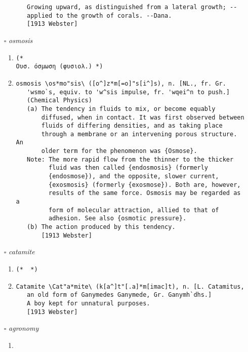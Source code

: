 \documentclass{article}
\begin{document}
\begin{itemize}
\begin{enumerate}
{\begin{lstlisting}
   Growing upward, as distinguished from a lateral growth; --
   applied to the growth of corals. --Dana.
   [1913 Webster]
\end{lstlisting}}
\end{enumerate}
\item[$\square$] \emph{ osmosis }
\begin{enumerate}
\item{
\begin{lstlisting}
(* 
Ουσ. όσμωση (φυσιολ.) *)
\end{lstlisting}}
\item{
\begin{lstlisting}
osmosis \os*mo"sis\ ([o^]z*m[=o]"s[i^]s), n. [NL., fr. Gr.
   'wsmo`s, equiv. to 'w^sis impulse, fr. 'wqei^n to push.]
   (Chemical Physics)
   (a) The tendency in fluids to mix, or become equably
       diffused, when in contact. It was first observed between
       fluids of differing densities, and as taking place
       through a membrane or an intervening porous structure. An
       older term for the phenomenon was {Osmose}.
   Note: The more rapid flow from the thinner to the thicker
         fluid was then called {endosmosis} (formerly
         {endosmose}), and the opposite, slower current,
         {exosmosis} (formerly {exosmose}). Both are, however,
         results of the same force. Osmosis may be regarded as a
         form of molecular attraction, allied to that of
         adhesion. See also {osmotic pressure}.
   (b) The action produced by this tendency.
       [1913 Webster]
\end{lstlisting}}
\end{enumerate}
\item[$\square$] \emph{ catamite }
\begin{enumerate}
\item{
\begin{lstlisting}
(*  *)
\end{lstlisting}}
\item{
\begin{lstlisting}
Catamite \Cat"a*mite\ (k[a^]t"[.a]*m[imac]t), n. [L. Catamitus,
   an old form of Ganymedes Ganymede, Gr. Ganymh`dhs.]
   A boy kept for unnatural purposes.
   [1913 Webster]
\end{lstlisting}}
\end{enumerate}
\item[$\square$] \emph{ agronomy }
\begin{enumerate}
\item{
\begin{lstlisting}

\end{lstlisting}}
\end{enumerate}
\end{itemize}
\end{document}
